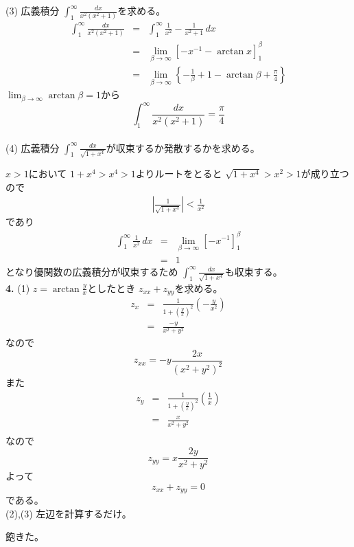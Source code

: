 \documentclass[dvipdfmx,twocolumn]{jsarticle}
\begin{document}
(3)
広義積分 $\int_1^\infty \frac{dx}{x^2 (x^2 + 1)}$を求める。
\begin{eqnarray*}
  \int_1^\infty \frac{dx}{x^2 (x^2 + 1)}
  & = & \int_1^\infty \frac{1}{x^2} - \frac{1}{x^2 + 1} \, dx \\
  & = & \lim_{\beta \to \infty} \left[ - x^{-1} - \arctan x \right]_1^\beta \\
  & = & \lim_{\beta \to \infty} \left\{ - \frac{1}{\beta} + 1 - \arctan \beta + \frac{\pi}{4} \right\}
\end{eqnarray*}
$\lim_{\beta \to \infty} \arctan \beta = 1$から
\[
\int_1^\infty \frac{dx}{x^2 (x^2 + 1)} = \frac{\pi}{4}
\]
\\

(4)
広義積分 $\int_1^\infty \frac{dx}{\sqrt{1 + x^4}}$が収束するか発散するかを求める。

$x > 1$において $1 + x^4 > x^4 > 1$よりルートをとると $\sqrt{1 + x^4} > x^2 > 1$が成り立つので
\begin{eqnarray*}
  \left| \frac{1}{\sqrt{1 + x^4}} \right| < \frac{1}{x^2}
\end{eqnarray*}
であり
\begin{eqnarray*}
  \int_1^\infty \frac{1}{x^2} \, dx
  & = & \lim_{\beta \to \infty} [ - x^{-1} ]_1^\beta \\
  & = & 1
\end{eqnarray*}
となり優関数の広義積分が収束するため $\int_1^\infty \frac{dx}{\sqrt{1 + x^4}}$も収束する。\\

\textbf{4.}
(1) $z = \arctan \frac{y}{x}$としたとき $z_{xx} + z_{yy}$を求める。
\begin{eqnarray*}
  z_x & = & \frac{1}{1 + \left( \frac{y}{x} \right)^2} \left( - \frac{y}{x^2} \right) \\
  & = & \frac{- y}{x^2 + y^2}
\end{eqnarray*}
なので
\[ z_{xx} = - y \frac{2x}{\left( x^2 + y^2 \right)^2} \]
また
\begin{eqnarray*}
  z_y & = & \frac{1}{1 + \left( \frac{y}{x} \right)^2} \left( \frac{1}{x} \right) \\
  & = & \frac{x}{x^2 + y^2} \\
\end{eqnarray*}
なので
\[z_{yy} = x \frac{2y}{x^2 + y^2}\]
よって
\[z_{xx} + z_{yy} = 0 \]
である。 \\

(2),(3)
左辺を計算するだけ。

飽きた。
\end{document}
